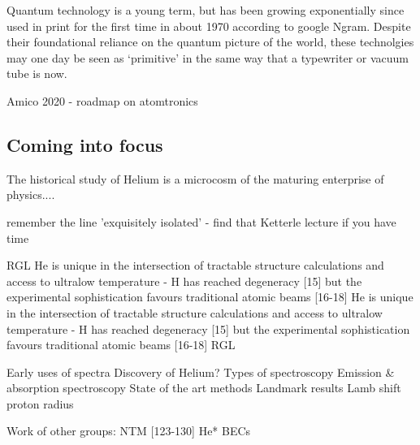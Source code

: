 	Quantum technology is a young term, but has been growing exponentially	since used in print for the first time in about 1970 according to google	Ngram. 
	Despite their foundational reliance on the quantum picture
	of the world, these technolgies may one day be seen as `primitive' in
	the same way that a typewriter or vacuum tube is now.



		Amico 2020 - roadmap on atomtronics

		
\subsection*{Coming into focus} %
	The historical study of Helium is a microcosm of the maturing enterprise of physics....

	remember the line 'exquisitely isolated' - find that Ketterle lecture if you have time

	RGL He is unique in the intersection of tractable structure calculations and access to ultralow temperature - H has reached degeneracy [15] but the experimental sophistication favours traditional atomic beams [16-18] 
	He is unique in the intersection of tractable structure calculations and access to ultralow temperature - H has reached degeneracy [15] but the experimental sophistication favours traditional atomic beams [16-18] RGL

	Early uses of spectra Discovery of Helium? Types of spectroscopy
	Emission \& absorption spectroscopy State of the art methods Landmark
	results Lamb shift proton radius



		Work of other groups:
		NTM [123-130] He* BECs 

